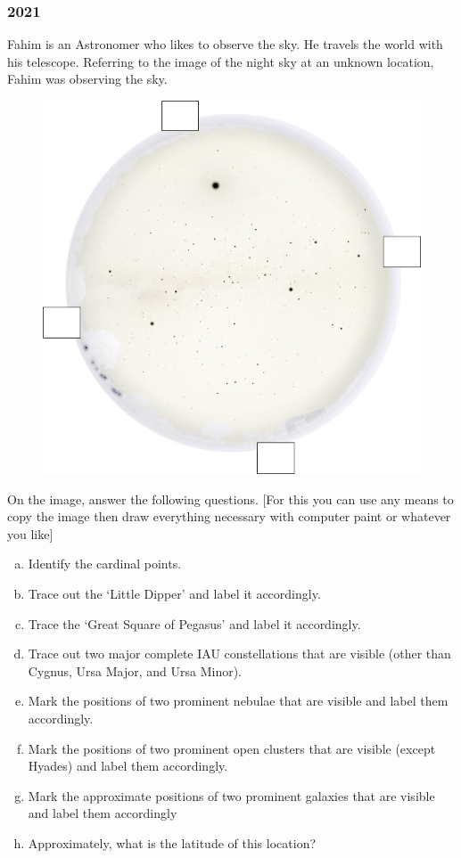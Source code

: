\documentclass[a4paper,12pt]{extarticle}
\begin{document}
\subsubsection{2021}
Fahim is an Astronomer who likes to observe the sky. He travels the world with his telescope. Referring to the image of the night sky at an unknown location, Fahim was observing the sky. 

\begin{figure}[H]
    \centering
    \includegraphics[width=\linewidth]{BDOAA_2.png}
\end{figure}

 On the image, answer the following questions. [For this you can use any means to copy the image then draw everything necessary with computer paint or whatever you like]
\begin{enumerate}[a.]
    \item  Identify the cardinal points.
    \item Trace out the `Little Dipper' and label it accordingly.
    \item Trace the `Great Square of Pegasus' and label it accordingly.
    \item Trace out two major complete IAU constellations that are visible (other than Cygnus, Ursa Major, and Ursa Minor).
    \item Mark the positions of two prominent nebulae that are visible and label them accordingly.
    \item Mark the positions of two prominent open clusters that are visible (except Hyades) and label them accordingly.
    \item Mark the approximate positions of two prominent galaxies that are visible and label them accordingly 
    \item Approximately, what is the latitude of this location?
\end{enumerate}
\end{document}
